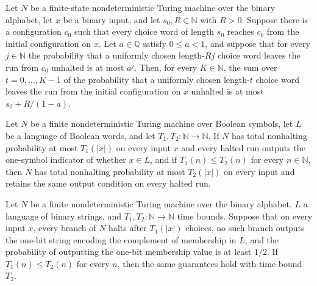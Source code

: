 \begin{theorem}
\label{Turing.FinNDTM.expTimeLe_of_rounds}
\leanok
{}
Let $N$ be a finite-state nondeterministic Turing machine over the binary alphabet, let
$x$ be a binary input, and let $s_0,R\in\mathbb{N}$ with $R>0$. Suppose there is a
configuration $c_0$ such that every choice word of length $s_0$ reaches $c_0$ from the
initial configuration on $x$. Let $a\in\mathbb{Q}$ satisfy $0\le a<1$, and suppose that
for every $j\in\mathbb{N}$ the probability that a uniformly chosen length-$Rj$ choice
word leaves the run from $c_0$ unhalted is at most $a^j$. Then, for every
$K\in\mathbb{N}$, the sum over $t=0,\ldots,K-1$ of the probability that a uniformly
chosen length-$t$ choice word leaves the run from the initial configuration on $x$
unhalted is at most $s_0+R/(1-a)$.
\end{theorem}

\begin{theorem}
\label{Turing.FinNDTM.ZDecidesInTime.mono}
\leanok
{}
Let $N$ be a finite nondeterministic Turing machine over Boolean symbols, let $L$ be a
language of Boolean words, and let $T_1,T_2\colon\mathbb{N}\to\mathbb{N}$. If $N$ has
total nonhalting probability at most $T_1(|x|)$ on every input $x$ and every halted run
outputs the one-symbol indicator of whether $x\in L$, and if $T_1(n)\le T_2(n)$ for
every $n\in\mathbb{N}$, then $N$ has total nonhalting probability at most $T_2(|x|)$ on
every input and retains the same output condition on every halted run.
\end{theorem}

\begin{theorem}
\label{Turing.FinNDTM.AbortDecidesInTime.mono}
\leanok
{}
Let $N$ be a finite nondeterministic Turing machine over the binary alphabet, $L$ a
language of binary strings, and $T_1,T_2:\mathbb{N}\to\mathbb{N}$ time bounds. Suppose
that on every input $x$, every branch of $N$ halts after $T_1(|x|)$ choices, no such
branch outputs the one-bit string encoding the complement of membership in $L$, and the
probability of outputting the one-bit membership value is at least $1/2$. If $T_1(n)\le
T_2(n)$ for every $n$, then the same guarantees hold with time bound $T_2$.
\end{theorem}


